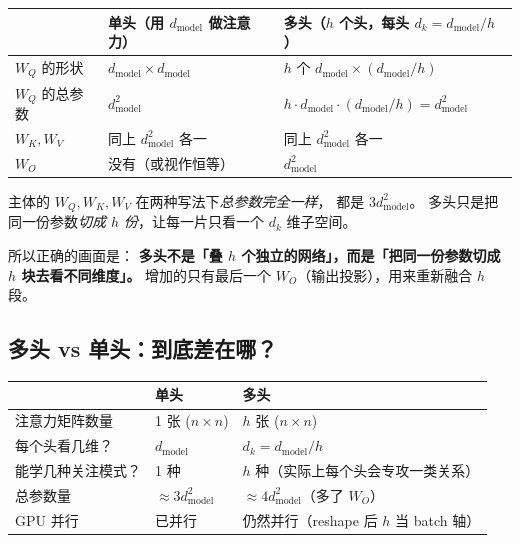 \documentclass[11pt,a4paper]{ctexart}
\begin{document}
\begin{center}
\renewcommand{\arraystretch}{1.3}
\begin{tabular}{@{}p{4.2cm} p{5cm} p{5cm}@{}}
\toprule
 & 单头（用 $d_{\text{model}}$ 做注意力） & 多头（$h$ 个头，每头 $d_k = d_{\text{model}}/h$）\\
\midrule
$W_Q$ 的形状     & $d_{\text{model}} \times d_{\text{model}}$        & $h$ 个 $d_{\text{model}} \times (d_{\text{model}}/h)$ \\
$W_Q$ 的总参数   & $d_{\text{model}}^2$                              & $h \cdot d_{\text{model}} \cdot (d_{\text{model}}/h) = d_{\text{model}}^2$ \\
$W_K, W_V$       & 同上 $d_{\text{model}}^2$ 各一                    & 同上 $d_{\text{model}}^2$ 各一 \\
$W_O$            & 没有（或视作恒等）                                & $d_{\text{model}}^2$ \\
\bottomrule
\end{tabular}
\end{center}

主体的 $W_Q, W_K, W_V$ 在两种写法下\emph{总参数完全一样}，
都是 $3 d_{\text{model}}^2$。
多头只是把同一份参数\emph{切成 $h$ 份}，让每一片只看一个 $d_k$ 维子空间。

\begin{intuitionblock}
所以正确的画面是：
\textbf{多头不是「叠 $h$ 个独立的网络」，而是「把同一份参数切成 $h$ 块去看不同维度」。}
增加的只有最后一个 $W_O$（输出投影），用来重新融合 $h$ 段。
\end{intuitionblock}

\subsection{多头 vs 单头：到底差在哪？}

\begin{center}
\renewcommand{\arraystretch}{1.3}
\begin{tabular}{@{}p{4cm} p{5cm} p{5cm}@{}}
\toprule
 & 单头 & 多头 \\
\midrule
注意力矩阵数量 & 1 张 ($n \times n$)              & $h$ 张 ($n \times n$) \\
每个头看几维？ & $d_{\text{model}}$                & $d_k = d_{\text{model}}/h$ \\
能学几种关注模式？ & 1 种                          & $h$ 种（实际上每个头会专攻一类关系） \\
总参数量       & $\approx 3 d_{\text{model}}^2$    & $\approx 4 d_{\text{model}}^2$（多了 $W_O$） \\
GPU 并行       & 已并行                            & 仍然并行（reshape 后 $h$ 当 batch 轴） \\
\bottomrule
\end{tabular}
\end{center}
\end{document}
